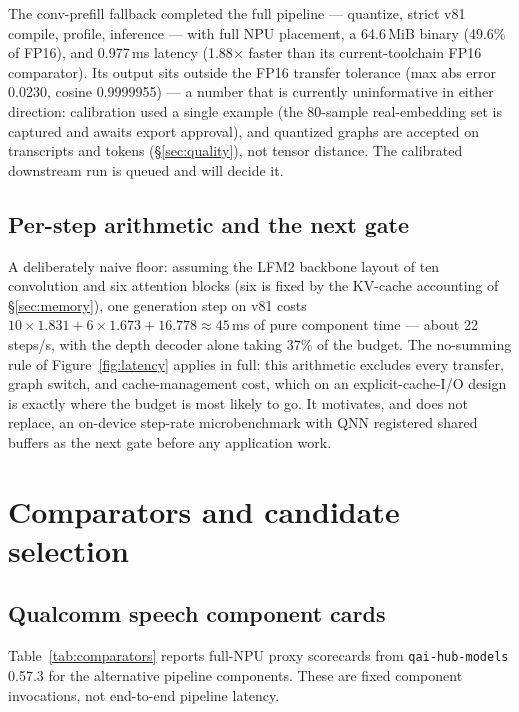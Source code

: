 \documentclass[10pt,twocolumn,letterpaper]{article}
\begin{document}
The conv-prefill fallback completed the full pipeline --- quantize, strict v81
compile, profile, inference --- with full NPU placement, a 64.6\,MiB binary
(49.6\% of FP16), and 0.977\,ms latency (1.88$\times$ faster than its
current-toolchain FP16 comparator). Its output sits outside the FP16
transfer tolerance (max abs error 0.0230, cosine 0.9999955) --- a number that
is currently uninformative in either direction: calibration used a single
example (the 80-sample real-embedding set is captured and awaits export
approval), and quantized graphs are accepted on transcripts and tokens
(\S\ref{sec:quality}), not tensor distance. The calibrated downstream run is
queued and will decide it.

\subsection{Per-step arithmetic and the next gate}

A deliberately naive floor: assuming the LFM2 backbone layout of ten
convolution and six attention blocks (six is fixed by the KV-cache accounting
of \S\ref{sec:memory}), one generation step on v81 costs
$10 \times 1.831 + 6 \times 1.673 + 16.778 \approx 45$\,ms of pure component
time --- about 22 steps/s, with the depth decoder alone taking 37\% of the
budget. The no-summing rule of Figure~\ref{fig:latency} applies in full: this
arithmetic excludes every transfer, graph switch, and cache-management cost,
which on an explicit-cache-I/O design is exactly where the budget is most
likely to go. It motivates, and does not replace, an on-device step-rate
microbenchmark with QNN registered shared buffers as the next gate before any
application work.

\section{Comparators and candidate selection}
\label{sec:candidates}

\subsection{Qualcomm speech component cards}

Table~\ref{tab:comparators} reports full-NPU proxy scorecards from
\texttt{qai-hub-models} 0.57.3 for the alternative pipeline components. These
are fixed component invocations, not end-to-end pipeline latency.
\end{document}
